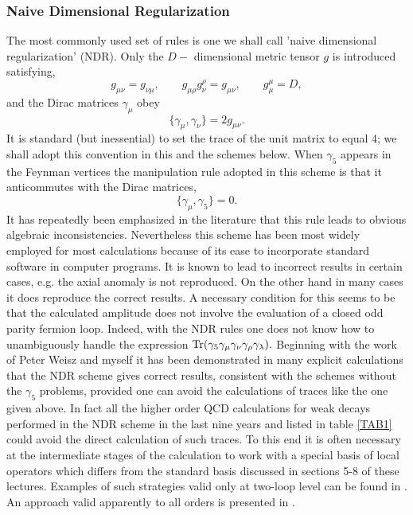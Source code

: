 \documentclass[12pt,rotate]{article}
\def\ga{\gamma}
\newcommand{\be}{\begin{equation}}
\newcommand{\ee}{\end{equation}}
\begin{document}
\begin{itemize}
\subsubsection{Naive Dimensional Regularization}
  The most commonly used set of rules is one we shall call 'naive dimensional
 regularization' (NDR).
 Only the $D-$ dimensional metric tensor $g$ is introduced satisfying,
\be\label{BW1}
 g_{\mu \nu} = g_{\nu \mu}, \qquad
 g_{\mu \rho} g^{\rho}_{\nu} = g_{\mu \nu}, \qquad
 g_{\mu}^{\mu} = D, 
\ee
 and the Dirac matrices $\gamma_{\mu}$ obey
\be\label{BW2}
 \{ \ga_{\mu} , \ga_{\nu} \} = 2 g_{\mu \nu}.
\ee
 It is standard (but inessential) to set the trace of the unit matrix
 to equal 4; we shall adopt this convention in this and the schemes below.
 When $\gamma_5$ appears in the Feynman vertices
 the manipulation rule adopted in this scheme is that it
 anticommutes with the Dirac matrices,
\be\label{BW3}
 \{ \ga_{\mu} , \gamma_5 \} = 0.
\ee
 It has repeatedly been emphasized in the literature \cite{BM,Bo}
 that this rule leads to obvious algebraic inconsistencies.
 Nevertheless this scheme has been most widely employed for most calculations
 because of its ease to incorporate standard software in computer programs.
 It is known to lead to incorrect results in certain cases, e.g. the axial
 anomaly is not reproduced. On the other hand in many cases
 it does reproduce the correct
 results. A necessary condition for this
 seems to be that the calculated amplitude does not involve the evaluation
 of a closed odd parity
 fermion loop. Indeed, with the NDR rules one does not know
 how to unambiguously handle the expression
$ 
{\rm Tr}(\gamma_5 \gamma_{\mu} \gamma_{\nu} \gamma_{\rho} \gamma_{\lambda}).
$
Beginning with the work of Peter Weisz and myself \cite{WEISZ} it has
been demonstrated in many explicit calculations that the NDR scheme
gives correct results, consistent with the schemes without the $\gamma_5$
problems, provided one can avoid the calculations of traces like the
one given above. In fact all the higher order QCD calculations for weak
decays performed
in the NDR scheme in the last nine years and listed in table 
\ref{TAB1} could
avoid the direct calculation of such traces. To this end 
it is often necessary at the
intermediate stages of the calculation 
to work with a special basis of local operators which differs from
the standard basis discussed in sections 5-8 of these lectures.
Examples of such strategies valid only at two-loop level can be
found in \cite{BJLW1,BJLW2,CURCI}. 
An approach valid apparently to all orders is presented
in \cite{MISTRIK}.


\end{itemize}
\end{document}
